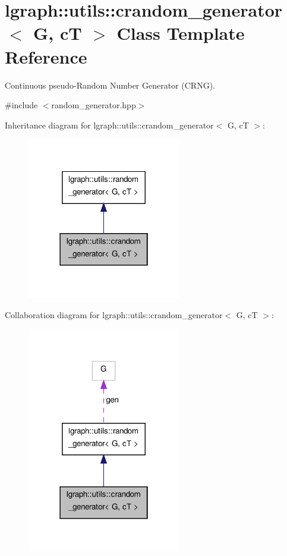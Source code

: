 \hypertarget{classlgraph_1_1utils_1_1crandom__generator}{\section{lgraph\-:\-:utils\-:\-:crandom\-\_\-generator$<$ G, c\-T $>$ Class Template Reference}
\label{classlgraph_1_1utils_1_1crandom__generator}
}


Continuous pseudo-\/\-Random Number Generator (C\-R\-N\-G).  




{\ttfamily \#include $<$random\-\_\-generator.\-hpp$>$}



Inheritance diagram for lgraph\-:\-:utils\-:\-:crandom\-\_\-generator$<$ G, c\-T $>$\-:\nopagebreak
\begin{figure}[H]
\begin{center}
\leavevmode
\includegraphics[width=190pt]{classlgraph_1_1utils_1_1crandom__generator__inherit__graph}
\end{center}
\end{figure}


Collaboration diagram for lgraph\-:\-:utils\-:\-:crandom\-\_\-generator$<$ G, c\-T $>$\-:\nopagebreak
\begin{figure}[H]
\begin{center}
\leavevmode
\includegraphics[width=190pt]{classlgraph_1_1utils_1_1crandom__generator__coll__graph}
\end{center}
\end{figure}
